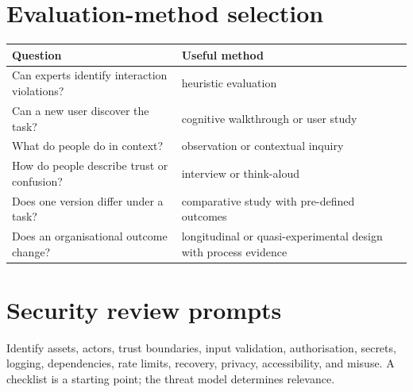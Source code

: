 \section{Evaluation-method selection}
\begin{center}
\begin{tabular}{p{}p{}}
\toprule
\textbf{Question} & \textbf{Useful method}\\
\midrule
Can experts identify interaction violations? & heuristic evaluation\\
Can a new user discover the task? & cognitive walkthrough or user study\\
What do people do in context? & observation or contextual inquiry\\
How do people describe trust or confusion? & interview or think-aloud\\
Does one version differ under a task? & comparative study with pre-defined outcomes\\
Does an organisational outcome change? & longitudinal or quasi-experimental design with process evidence\\
\bottomrule
\end{tabular}
\end{center}

\section{Security review prompts}
Identify assets, actors, trust boundaries, input validation, authorisation, secrets, logging, dependencies, rate limits, recovery, privacy, accessibility, and misuse. A checklist is a starting point; the threat model determines relevance.
